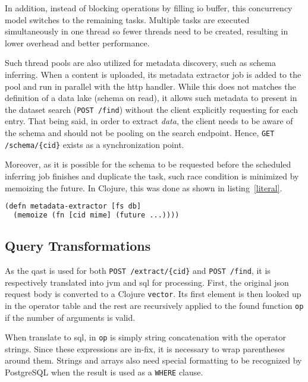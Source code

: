 In addition, instead of blocking operations by filling \gls{io} buffer,
this concurrency model switches to the remaining tasks.  Multiple tasks
are executed simultaneously in one thread so fewer threads need to be created,
resulting in lower overhead and better performance.

Such thread pools are also utilized for metadata discovery, such as
schema inferring.  When a \gls{content} is uploaded, its metadata extractor job
is added to the pool and run in parallel with the \gls{http} handler.
While this does not matches the definition of a data lake (schema on read),
it allows such metadata to present in the dataset search (\verb|POST /find|)
without the client explicitly requesting for each entry.  That being said,
in order to extract \emph{data}, the client needs to be aware of the schema
and should not be pooling on the search endpoint.  Hence,
\verb|GET /schema/{cid}| exists as a synchronization point.

Moreover, as it is possible for the schema to be requested before the scheduled
inferring job finishes and duplicate the task, such race condition is minimized
by memoizing the future.  In Clojure, this was done as shown
in listing~\ref{literal}.
\begin{lstlisting}[label=literal,caption=Constructing
  a metadata extractor,language=lisp]
(defn metadata-extractor [fs db]
  (memoize (fn [cid mime] (future ...))))
\end{lstlisting}

\subsection{Query Transformations}
As the \gls{qast} is used for both \verb|POST /extract/{cid}|
and \verb|POST /find|, it is respectively translated into \gls{jvm}
and \gls{sql} for processing.  First, the original \gls{json} request body
is converted to a Clojure \verb|vector|.  Its first element is then looked up
in the operator table and the rest are recursively applied to the found function
\verb|op| if the number of arguments is valid.

When translate to \gls{sql}, in \verb|op| is simply string concatenation
with the operator strings.  Since these expressions are in-fix, it is necessary
to wrap parentheses around them.  Strings and arrays also need special
formatting to be recognized by PostgreSQL when the result is used
as a \verb|WHERE| clause.


